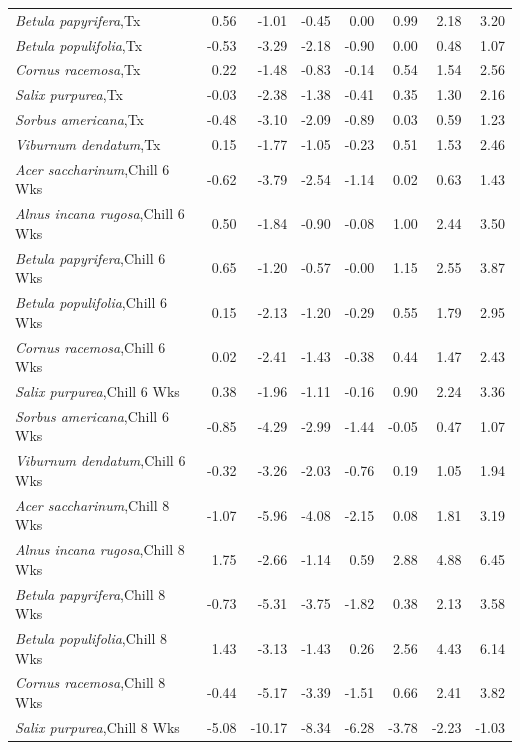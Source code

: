 \documentclass{article}\usepackage[]{graphicx}\usepackage[]{color}
\begin{document}
\begin{longtable}{lrrrrrrr}
  \textit{Betula papyrifera},Tx & 0.56 & -1.01 & -0.45 & 0.00 & 0.99 & 2.18 & 3.20 \\ 
  \textit{Betula populifolia},Tx & -0.53 & -3.29 & -2.18 & -0.90 & 0.00 & 0.48 & 1.07 \\ 
  \textit{Cornus racemosa},Tx & 0.22 & -1.48 & -0.83 & -0.14 & 0.54 & 1.54 & 2.56 \\ 
  \textit{Salix purpurea},Tx & -0.03 & -2.38 & -1.38 & -0.41 & 0.35 & 1.30 & 2.16 \\ 
  \textit{Sorbus americana},Tx & -0.48 & -3.10 & -2.09 & -0.89 & 0.03 & 0.59 & 1.23 \\ 
  \textit{Viburnum dendatum},Tx & 0.15 & -1.77 & -1.05 & -0.23 & 0.51 & 1.53 & 2.46 \\ 
  \textit{Acer saccharinum},Chill 6 Wks & -0.62 & -3.79 & -2.54 & -1.14 & 0.02 & 0.63 & 1.43 \\ 
  \textit{Alnus incana rugosa},Chill 6 Wks & 0.50 & -1.84 & -0.90 & -0.08 & 1.00 & 2.44 & 3.50 \\ 
  \textit{Betula papyrifera},Chill 6 Wks & 0.65 & -1.20 & -0.57 & -0.00 & 1.15 & 2.55 & 3.87 \\ 
  \textit{Betula populifolia},Chill 6 Wks & 0.15 & -2.13 & -1.20 & -0.29 & 0.55 & 1.79 & 2.95 \\ 
  \textit{Cornus racemosa},Chill 6 Wks & 0.02 & -2.41 & -1.43 & -0.38 & 0.44 & 1.47 & 2.43 \\ 
  \textit{Salix purpurea},Chill 6 Wks & 0.38 & -1.96 & -1.11 & -0.16 & 0.90 & 2.24 & 3.36 \\ 
  \textit{Sorbus americana},Chill 6 Wks & -0.85 & -4.29 & -2.99 & -1.44 & -0.05 & 0.47 & 1.07 \\ 
  \textit{Viburnum dendatum},Chill 6 Wks & -0.32 & -3.26 & -2.03 & -0.76 & 0.19 & 1.05 & 1.94 \\ 
  \textit{Acer saccharinum},Chill 8 Wks & -1.07 & -5.96 & -4.08 & -2.15 & 0.08 & 1.81 & 3.19 \\ 
  \textit{Alnus incana rugosa},Chill 8 Wks & 1.75 & -2.66 & -1.14 & 0.59 & 2.88 & 4.88 & 6.45 \\ 
  \textit{Betula papyrifera},Chill 8 Wks & -0.73 & -5.31 & -3.75 & -1.82 & 0.38 & 2.13 & 3.58 \\ 
  \textit{Betula populifolia},Chill 8 Wks & 1.43 & -3.13 & -1.43 & 0.26 & 2.56 & 4.43 & 6.14 \\ 
  \textit{Cornus racemosa},Chill 8 Wks & -0.44 & -5.17 & -3.39 & -1.51 & 0.66 & 2.41 & 3.82 \\ 
  \textit{Salix purpurea},Chill 8 Wks & -5.08 & -10.17 & -8.34 & -6.28 & -3.78 & -2.23 & -1.03 \\ 

\end{longtable}
\end{document}
